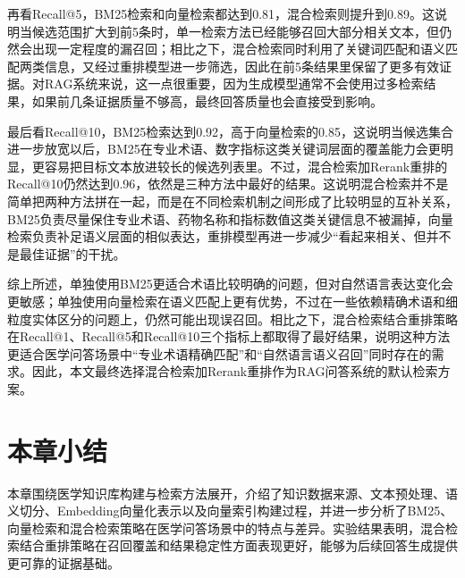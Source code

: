 再看Recall@5，BM25检索和向量检索都达到0.81，混合检索则提升到0.89。这说明当候选范围扩大到前5条时，单一检索方法已经能够召回大部分相关文本，但仍然会出现一定程度的漏召回；相比之下，混合检索同时利用了关键词匹配和语义匹配两类信息，又经过重排模型进一步筛选，因此在前5条结果里保留了更多有效证据。对RAG系统来说，这一点很重要，因为生成模型通常不会使用过多检索结果，如果前几条证据质量不够高，最终回答质量也会直接受到影响。

最后看Recall@10，BM25检索达到0.92，高于向量检索的0.85，这说明当候选集合进一步放宽以后，BM25在专业术语、数字指标这类关键词层面的覆盖能力会更明显，更容易把目标文本放进较长的候选列表里。不过，混合检索加Rerank重排的Recall@10仍然达到0.96，依然是三种方法中最好的结果。这说明混合检索并不是简单把两种方法拼在一起，而是在不同检索机制之间形成了比较明显的互补关系，BM25负责尽量保住专业术语、药物名称和指标数值这类关键信息不被漏掉，向量检索负责补足语义层面的相似表达，重排模型再进一步减少“看起来相关、但并不是最佳证据”的干扰。

综上所述，单独使用BM25更适合术语比较明确的问题，但对自然语言表达变化会更敏感；单独使用向量检索在语义匹配上更有优势，不过在一些依赖精确术语和细粒度实体区分的问题上，仍然可能出现误召回。相比之下，混合检索结合重排策略在Recall@1、Recall@5和Recall@10三个指标上都取得了最好结果，说明这种方法更适合医学问答场景中“专业术语精确匹配”和“自然语言语义召回”同时存在的需求。因此，本文最终选择混合检索加Rerank重排作为RAG问答系统的默认检索方案。

\section{本章小结}

本章围绕医学知识库构建与检索方法展开，介绍了知识数据来源、文本预处理、语义切分、Embedding向量化表示以及向量索引构建过程，并进一步分析了BM25、向量检索和混合检索策略在医学问答场景中的特点与差异。实验结果表明，混合检索结合重排策略在召回覆盖和结果稳定性方面表现更好，能够为后续回答生成提供更可靠的证据基础。
